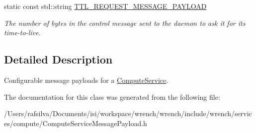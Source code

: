 \begin{DoxyCompactItemize}
\mbox{\label{classwrench_1_1_compute_service_message_payload_a951187b1bb9fb20d7944e5577b94ae47}} 
static const std\+::string \hyperlink{classwrench_1_1_compute_service_message_payload_a951187b1bb9fb20d7944e5577b94ae47}{T\+T\+L\+\_\+\+R\+E\+Q\+U\+E\+S\+T\+\_\+\+M\+E\+S\+S\+A\+G\+E\+\_\+\+P\+A\+Y\+L\+O\+AD}
\begin{DoxyCompactList}\small\item\em The number of bytes in the control message sent to the daemon to ask it for its time-\/to-\/live. \end{DoxyCompactList}\end{DoxyCompactItemize}


\subsection{Detailed Description}
Configurable message payloads for a \hyperlink{classwrench_1_1_compute_service}{Compute\+Service}. 

The documentation for this class was generated from the following file\+:\begin{DoxyCompactItemize}
\item 
/\+Users/rafsilva/\+Documents/isi/workspace/wrench/wrench/include/wrench/services/compute/Compute\+Service\+Message\+Payload.\+h\end{DoxyCompactItemize}

